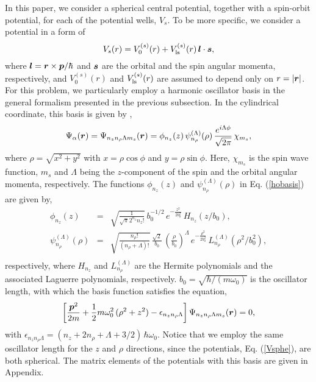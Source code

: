 \documentclass[superscriptaddress,twocolumn,amsmath,amssymb]{revtex4}
\renewcommand{\vec}[1]{\mbox{\boldmath $#1$}}
\begin{document}
In this paper, we consider a spherical central 
potential, together with a spin-orbit potential, for each of the potential 
wells, $V_s$. 
To be more specific, we consider a potential in a form of 
%
\begin{equation}
V_s(r)=V^{(s)}_0(r)+V^{(s)}_{\rm ls}(r)\,\vec{l}\cdot\vec{s}, 
\label{Vsphe}
\end{equation}
%
where $\vec{l}=\vec{r}\times\vec{p}/\hbar$ 
and $\vec{s}$ are the orbital and the spin angular momenta, 
respectively, and $V^{(s)}_0(r)$ and $V^{(s)}_{\rm ls}(r)$ are assumed to depend only on 
$r=|\vec{r}|$. For this problem, 
we particularly employ a harmonic oscillator basis 
in the general formalism presented in the previous subsection. 
In the cylindrical coordinate, this basis is given by \cite{Vautherin73}, 
%
\begin{equation}
\Psi_\alpha(\vec{r})=\Psi_{n_z n_\rho \Lambda m_s}(\vec{r})
=\phi_{n_z}(z)\,\psi_{n_\rho}^{(\Lambda)}(\rho)\,
\frac{e^{i\Lambda \phi}}{\sqrt{2\pi}}\,\chi_{m_s},
\label{hobasis}
\end{equation}
%
where $\rho=\sqrt{x^2+y^2}$ with $x=\rho\cos\phi$ and $y=\rho\sin\phi$. 
Here, $\chi_{m_s}$ is the spin wave function, $m_s$ and $\Lambda$ being the 
$z$-component of the spin and the orbital angular momenta, respectively. 
The functions $\phi_{n_z}(z)$ and $\psi_{n_\rho}^{(\Lambda)}(\rho)$ in 
Eq. (\ref{hobasis}) are given by, 
%
\begin{eqnarray}
\phi_{n_z}(z)&=&\sqrt{\frac{1}{\sqrt{\pi}2^{n_z}n_z!}}\,b_0^{-1/2}\,
e^{-\frac{z^2}{2b_0^2}}\,H_{n_z}(z/b_0), 
\label{HO_z}
\\
\psi_{n_\rho}^{(\Lambda)}(\rho)&=&
\sqrt{\frac{n_\rho!}{(n_\rho+\Lambda)!}}\,\frac{\sqrt{2}}{b_0}\,
\left(\frac{\rho}{b_0}\right)^\Lambda\,e^{-\frac{\rho^2}{2b_0^2}}\,
L_{n_\rho}^{(\Lambda)}(\rho^2/b_0^2), \nonumber \\
\end{eqnarray}
%
respectively, where $H_{n_z}$ and $L_{n_\rho}^{(\Lambda)}$ 
are the Hermite polynomials and the associated Laguerre polynomials, 
respectively. $b_0=\sqrt{\hbar/(m\omega_0)}$ is the oscillator 
length, with which the basis function satisfies the equation, 
%
\begin{equation}
\left[\frac{\vec{p}^2}{2m}+\frac{1}{2}m\omega_0^2\,(\rho^2+z^2)
-\epsilon_{n_z n_\rho \Lambda}\right]
\Psi_{n_z n_\rho \Lambda m_s}(\vec{r})=0,
\end{equation}
%
with $\epsilon_{n_z n_\rho \Lambda}=(n_z+2n_\rho+\Lambda+3/2)\,\hbar\omega_0$. 
Notice that we employ the same oscillator length for the $z$ and $\rho$ 
directions, since the potentials, Eq. (\ref{Vsphe}), are both spherical. 
The matrix elements of the potentials with this basis are given in 
Appendix. 
\end{document}
